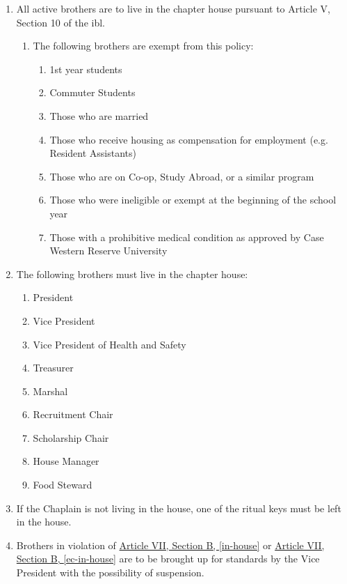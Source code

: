 	\begin{enumerate}
		\item All active brothers are to live in the chapter house pursuant to Article V, Section 10 of the \gls{ibl}.\label{in-house}
			\begin{enumerate}
				\item The following brothers are exempt from this policy:
					
					\begin{enumerate}
						\item 1st year students
						\item Commuter Students
						\item Those who are married
						\item Those who receive housing as compensation for employment (e.g. Resident Assistants)
						\item Those who are on Co-op, Study Abroad, or a similar program
						\item Those who were ineligible or exempt at the beginning of the school year
                        \item Those with a prohibitive medical condition as approved by Case Western Reserve University
					\end{enumerate}
			\end{enumerate}

		\item The following brothers must live in the chapter house: \label{ec-in-house}
			\begin{enumerate}
				\item President
				\item Vice President
				\item Vice President of Health and Safety
				\item Treasurer
				\item Marshal
				\item Recruitment Chair
				\item Scholarship Chair
				\item House Manager
				\item Food Steward
			\end{enumerate}

		\item If the Chaplain is not living in the house, one of the ritual keys must be left in the house.

		\item Brothers in violation of \hyperref[in-house]{Article VII, Section B, \autoref*{in-house}} or \hyperref[ec-in-house]{Article VII, Section B, \autoref*{ec-in-house}} are to be brought up for standards by the Vice President with the possibility of suspension.


\end{enumerate}
